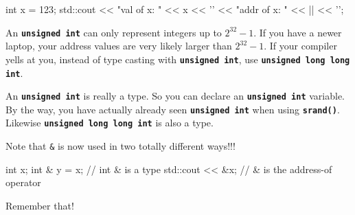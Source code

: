 \begin{consolethree}[escapeinside=||]
int x = 123;
std::cout << "val of x: " << x
          << '\n' << "addr of x: "
          << ||
          << '\n';
\end{consolethree}
An \texttt{\textbf{unsigned int}} can only represent integers up to $2^{32} - 1$. If you have a newer laptop, your address values are very likely larger than $2^{32} - 1$. If your compiler yells at you, instead of type casting with \texttt{\textbf{unsigned int}}, use \texttt{\textbf{unsigned long long int}}.

An \texttt{\textbf{unsigned int}} is really a type. So you can declare an \texttt{\textbf{unsigned int}} variable. By the way, you have actually already seen \texttt{\textbf{unsigned int}} when using \texttt{\textbf{srand()}}. Likewise \texttt{\textbf{unsigned long long int}} is also a type.







Note that \texttt{\&} is now used in two totally different ways!!!

\begin{consolethree}[escapeinside=||]
int x;
int & y = x;     // int & is a type
std::cout << &x; // & is the address-of operator
\end{consolethree}
Remember that!


